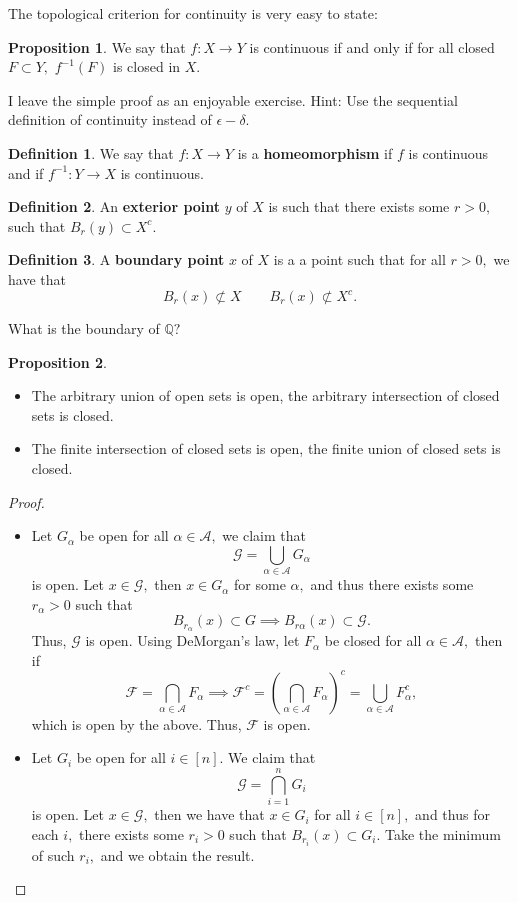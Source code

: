 \documentclass[10pt, oneside]{article}
\newcommand{\bbQ}{\mathbb{Q}}
\theoremstyle{definition}
\newtheorem{defn}{Definition}
\newtheorem{prop}{Proposition}
\begin{document}
The topological criterion for continuity is very easy to state:
\begin{prop}
    We say that $f: X \to Y$ is  continuous if and only if for all closed $F \subset Y,$ $f^{-1}(F)$ is closed in $X.$
\end{prop}
I leave the simple proof as an enjoyable exercise. Hint: Use the sequential definition of continuity instead of $\epsilon-\delta.$
\begin{defn}
    We say that $f: X \to Y$ is a \textbf{homeomorphism} if $f$ is continuous and if $f^{-1}: Y \to X$ is continuous. 
\end{defn}
\begin{defn}
    An \textbf{exterior point} $y$ of $X$ is such that there exists some $r>0,$ such that $B_r(y) \subset X^c.$
\end{defn}
\begin{defn}
    A \textbf{boundary point} $x$ of $X$ is a a point such that for all $r>0,$ we have that 
    \[B_r(x) \not \subset X \qquad B_r(x) \not \subset X^c.\]
\end{defn}
What is the boundary of $\bbQ?$
\begin{prop}
    \begin{itemize}
        \item The arbitrary union of open sets is open, the arbitrary intersection of closed sets is closed.
        \item The finite intersection of closed sets is open, the finite union of closed sets is closed.
    \end{itemize}
\end{prop}
\begin{proof}
    \begin{itemize}
        \item Let $G_\alpha$ be open for all $\alpha \in \mathcal{A},$ we claim that
        \[\mathcal{G} = \bigcup_{\alpha \in \mathcal{A}} G_\alpha\] is open. Let $x \in \mathcal{G},$ then $x \in G_\alpha$ for some $\alpha,$ and thus there exists some $r_\alpha >0$ such that \[B_{r_\alpha}(x)\subset G \implies B_{r\alpha}(x)\subset \mathcal{G}.\] Thus, $\mathcal{G}$ is open. Using DeMorgan's law, let $F_\alpha$ be closed for all $\alpha \in \mathcal{A},$ then if
        \[\mathcal{F} = \bigcap_{\alpha \in \mathcal{A}} F_\alpha \implies \mathcal{F}^c = \left( \bigcap_{\alpha \in \mathcal{A}} F_\alpha\right)^c = \bigcup_{\alpha \in \mathcal{A}} F_\alpha^c,\] which is open by the above. Thus, $\mathcal{F}$ is open.
        \item Let $G_i$ be open for all $i \in [n].$ We claim that 
        \[\mathcal{G} = \bigcap_{i=1}^n G_i\] is open. Let $x \in \mathcal{G},$ then we have that $x \in G_i$ for all $i \in [n],$ and thus for each $i,$ there exists some $r_i >0$ such that $B_{r_i}(x) \subset G_i.$ Take the minimum of such $r_i,$ and we obtain the result. 
    \end{itemize}
\end{proof}
\end{document}
